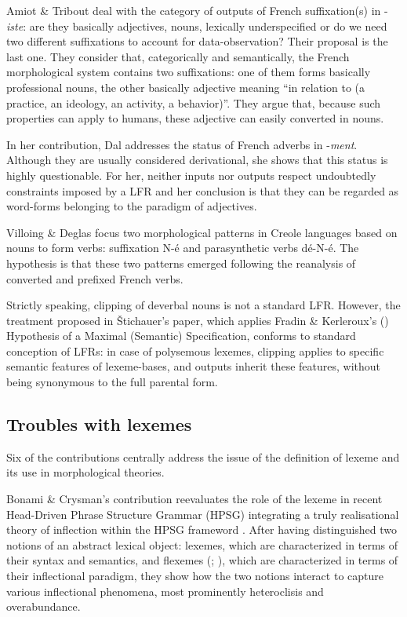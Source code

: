 \documentclass[output=paper]{langsci/langscibook}
\begin{document}
Amiot \& Tribout deal with the category of outputs of French
suffixation(s) in -\emph{iste}: are they basically adjectives, nouns,
lexically underspecified or do we need two different suffixations to
account for data-observation? Their proposal is the last one. They
consider that, categorically and semantically, the French morphological
system contains two suffixations: one of them forms basically
professional nouns, the other basically adjective meaning ``in relation
to (a practice, an ideology, an activity, a behavior)''. They argue that, because 
such properties can apply to humans, these adjective can easily
converted in nouns.

In her contribution, Dal addresses the status of French adverbs in
-\emph{ment}. Although they are usually considered derivational, she
shows that this status is highly questionable. For her, neither inputs nor
outputs respect undoubtedly constraints imposed by a LFR and her
conclusion is that they can be regarded as word-forms belonging to the
paradigm of adjectives.

Villoing \& Deglas focus two morphological patterns in Creole
languages based on nouns to form verbs: suffixation N-é and
parasynthetic verbs dé-N-é. The hypothesis is that these two patterns
emerged following the reanalysis of converted and prefixed French verbs.

Strictly speaking, clipping of deverbal nouns is not a standard LFR.
However, the treatment proposed in \v{S}tichauer's paper, which applies
Fradin \& Kerleroux's (\citeyear{Fradin03}) Hypothesis of a Maximal (Semantic)
Specification,  conforms to standard conception of LFRs: in case of
polysemous lexemes, clipping applies to specific semantic features of
lexeme-bases, and outputs inherit these features, without being
synonymous to the full parental form.

\subsection{Troubles with lexemes}
\largerpage
Six of the contributions centrally address the issue of the definition
of lexeme and its use in morphological theories.

Bonami \& Crysman's contribution reevaluates the role of the lexeme in
recent Head-Driven Phrase Structure Grammar (HPSG) integrating a truly
realisational theory of inflection within the HPSG frameword %
\citep{Bonami.2016}%
%
. After having distinguished two notions of an abstract
lexical object: lexemes, which are characterized in terms of their
syntax and semantics, and flexemes (\citealt[159]{Fradin03}; \citealt{Fradin03b}), which are characterized in terms of their inflectional
paradigm, they show how the two notions interact to capture various inflectional phenomena, most prominently heteroclisis and overabundance.
\end{document}
